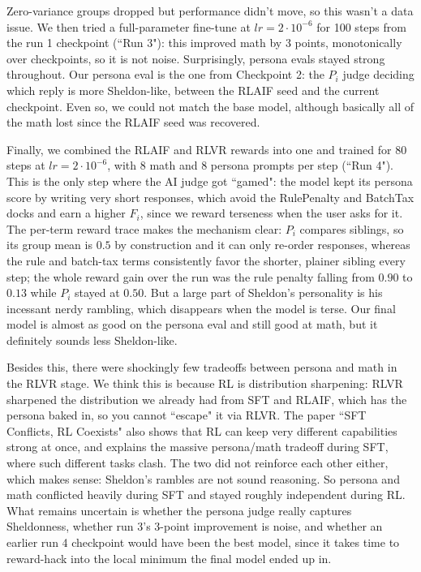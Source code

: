 \documentclass[9pt]{extarticle}
\begin{document}
Zero-variance groups dropped but performance didn't move, so this wasn't a data issue. We then tried a full-parameter fine-tune at $lr=2\cdot 10^{-6}$ for 100 steps from the run 1 checkpoint (``Run 3"): this improved math by 3 points, monotonically over checkpoints, so it is not noise. Surprisingly, persona evals stayed strong throughout. Our persona eval is the one from Checkpoint 2: the $P_i$ judge deciding which reply is more Sheldon-like, between the RLAIF seed and the current checkpoint. Even so, we could not match the base model, although basically all of the math lost since the RLAIF seed was recovered.

Finally, we combined the RLAIF and RLVR rewards into one and trained for 80 steps at $lr=2\cdot 10^{-6}$, with 8 math and 8 persona prompts per step (``Run 4"). This is the only step where the AI judge got ``gamed": the model kept its persona score by writing very short responses, which avoid the RulePenalty and BatchTax docks and earn a higher $F_i$, since we reward terseness when the user asks for it. The per-term reward trace makes the mechanism clear: $P_i$ compares siblings, so its group mean is $0.5$ by construction and it can only re-order responses, whereas the rule and batch-tax terms consistently favor the shorter, plainer sibling every step; the whole reward gain over the run was the rule penalty falling from $0.90$ to $0.13$ while $P_i$ stayed at $0.50$. But a large part of Sheldon's personality is his incessant nerdy rambling, which disappears when the model is terse. Our final model is almost as good on the persona eval and still good at math, but it definitely sounds less Sheldon-like.

Besides this, there were shockingly few tradeoffs between persona and math in the RLVR stage. We think this is because RL is distribution sharpening: RLVR sharpened the distribution we already had from SFT and RLAIF, which has the persona baked in, so you cannot ``escape" it via RLVR. The paper ``SFT Conflicts, RL Coexists" also shows that RL can keep very different capabilities strong at once, and explains the massive persona/math tradeoff during SFT, where such different tasks clash. The two did not reinforce each other either, which makes sense: Sheldon's rambles are not sound reasoning. So persona and math conflicted heavily during SFT and stayed roughly independent during RL. What remains uncertain is whether the persona judge really captures Sheldonness, whether run 3's 3-point improvement is noise, and whether an earlier run 4 checkpoint would have been the best model, since it takes time to reward-hack into the local minimum the final model ended up in.
\end{document}
